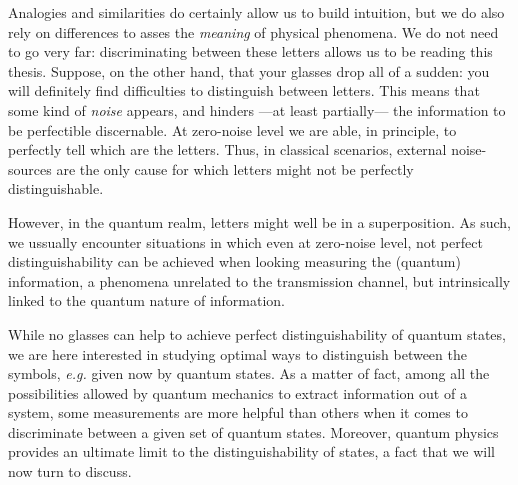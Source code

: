 Analogies and similarities do certainly allow us to build intuition, but we do also rely on differences to asses the \textit{meaning} of physical phenomena. We do not need to go very far: discriminating between these letters allows us to be reading this thesis. Suppose, on the other hand, that your glasses drop all of a sudden: you will definitely find difficulties to distinguish between letters. This means that some kind of \textit{noise} appears, and hinders ---at least partially--- the information to be perfectible discernable. At zero-noise level we are able, in principle, to perfectly tell which are the letters. Thus, in  classical scenarios, external noise-sources are the only cause for which letters might not be perfectly distinguishable.

However, in the quantum realm, letters might well be in a superposition. As such, we ussually encounter situations in which even at zero-noise level, not perfect distinguishability can be achieved when looking measuring the (quantum) information, a phenomena unrelated to the transmission channel, but intrinsically linked to the quantum nature of information.

While no glasses can help to achieve perfect distinguishability of quantum states, we are here interested in studying optimal ways to distinguish between the symbols, \textit{e.g.} given now by quantum states. As a matter of fact, among all the possibilities allowed by quantum mechanics to extract information out of a system, some measurements are more helpful than others when it comes to discriminate between a given set of quantum states. Moreover, quantum physics provides an ultimate limit to the distinguishability of states, a fact that we will now turn to discuss.

